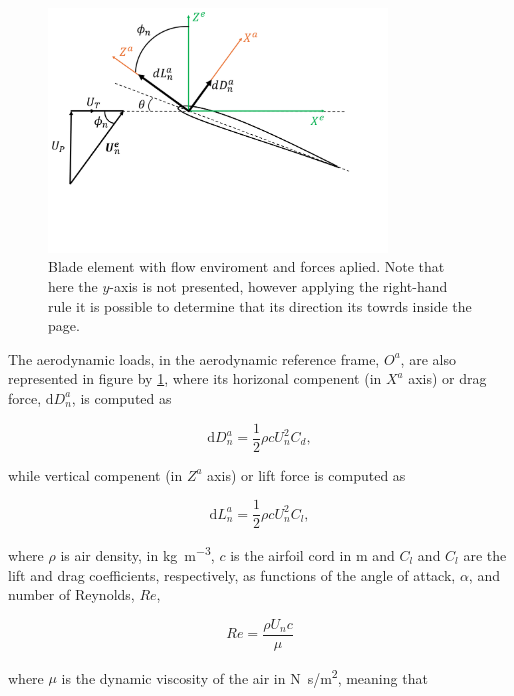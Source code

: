 \begin{figure}[!htb]
    \centering
    \includegraphics[width=9cm]{Figures/background/bet/element.png}
    \caption{Blade element with flow enviroment and forces aplied. Note that here the $y$-axis is not presented, however applying the right-hand rule it is possible to determine that its direction its towrds inside the page.}
    \label{fig:element_bet}
\end{figure}

The aerodynamic loads, in the aerodynamic reference frame, $O^a$, are also represented in figure by \ref{fig:element_bet}, where its horizonal compenent (in $X^a$ axis) or drag force, $\mathrm{d}D_n^a$, is computed as

\begin{equation}
    \mathrm{d}D^a_n = \frac{1}{2} \rho c U_n^2 C_d,
    \label{eq:drag_element}
\end{equation}

\noindent while vertical compenent (in $Z^a$ axis) or lift force is computed as

\begin{equation}
    \mathrm{d}L^a_n = \frac{1}{2} \rho c U_n^2 C_l,
    \label{eq:lift_element}
\end{equation}

\noindent where $\rho$ is air density, in \unit{\kg\per\meter^3}, $c$ is the airfoil cord in \unit{\meter} and $C_l$ and $C_l$ are the lift and drag coefficients, respectively, as functions of the angle of attack, $\alpha$, and number of Reynolds, $Re$,

\begin{equation}
    Re = \frac{\rho U_n c}{\mu}
    \label{eq:reynolds_number}
\end{equation}

\noindent where $\mu$ is the dynamic viscosity of the air in \unit{N s/m^2}, meaning that

